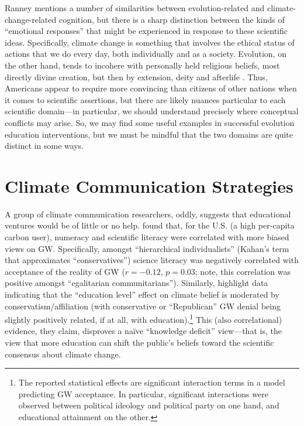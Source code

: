 Ranney mentions a number of similarities between evolution-related and
climate-change-related cognition, but there is a sharp distinction between the
kinds of ``emotional responses'' that might be experienced in response to these
scientific ideas. Specifically, climate change is something that involves the
ethical status of actions that we do every day, both individually and as a
society.  Evolution, on the other hand, tends to incohere with personally held
religious beliefs, most directly divine creation, but then by extension, deity
and afterlife \parencite{ranney_why_2012}. Thus, Americans appear to require
more convincing than citizens of other nations when it comes to scientific
assertions, but there are likely nuances particular to each scientific
domain---in particular, we should understand precisely where conceptual
conflicts may arise. So, we may find some useful examples in successful
evolution education interventions, but we must be mindful that the two domains
are quite distinct in some ways.


\section{Climate Communication Strategies}
\label{sec:comm-strategies}

A group of climate communication researchers, oddly, suggests that educational
ventures would be of little or no help. \textcite{kahan_polarizing_2012} found
that, for the U.S. (a high per-capita carbon user), numeracy and scientific
literacy were correlated with more biased views on GW. Specifically, amongst
“hierarchical individualists” (Kahan's term that approximates “conservatives”)
science literacy was negatively correlated with acceptance of the reality of GW
($r = -0.12$, $p = 0.03$; note, this correlation was positive amongst
“egalitarian communitarians”). Similarly,
\textcite{mccright_politicization_2011} highlight data indicating that the
``education level'' effect on climate belief is moderated by
conservatism/affiliation (with conservative or ``Republican'' GW denial being
slightly positively related, if at all, with education).\footnote{The reported
    statistical effects are significant interaction terms in a model predicting
    GW acceptance. In particular, significant interactions were observed between
    political ideology and political party on one hand, and educational
    attainment on the other.} 
This (also correlational) evidence, they claim,
disproves a naïve ``knowledge deficit'' view---that is, the view that more
education can shift the public's beliefs toward the scientific consensus about
climate change. 

